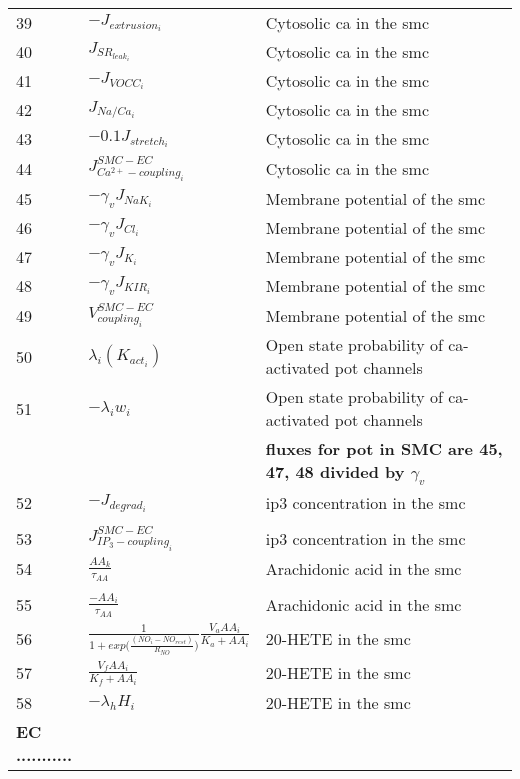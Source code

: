 \documentclass[]{article}
\newcommand{\pot}{\gls{pot}\xspace}
\newcommand{\ca}{\gls{ca}\xspace}
\newcommand{\ip}{\gls{ip3}\xspace}
\begin{document}
\begin{longtable}[h!] { p{0.12\linewidth}  p{0.28\linewidth}     p{0.6\linewidth} }
39 &    $- J_{extrusion_{i}} $ &Cytosolic \ca in the \gls{smc} \\
40 &    $  J_{SR_{leak_{i}}}$ & Cytosolic \ca in the \gls{smc}\\
41 &    $- J_{VOCC_{i}}  $ &Cytosolic \ca in the \gls{smc}  \\
42 &    $ J_{Na/Ca_{i}} $ & Cytosolic \ca in the \gls{smc}\\
43 &    $- 0.1J_{stretch_{i}} $ & Cytosolic \ca in the \gls{smc}\\
44 &    $J_{Ca^{2+}-coupling_{i}}^{SMC-EC} $ &Cytosolic \ca in the \gls{smc} \\
45 &    $-\gamma_v J_{NaK_{i}}$ & Membrane potential of the \gls{smc}\\
46 &    $-\gamma_v J_{Cl_{i}}  $ & Membrane potential of the \gls{smc}\\
47 &    $-\gamma_v J_{K_{i}}$ & Membrane potential of the \gls{smc} \\
48 &    $-\gamma_v J_{KIR_{i}} $ & Membrane potential of the \gls{smc}\\
49 &    $V^{SMC-EC}_{coupling_{i}} $ &  Membrane potential of the \gls{smc}\\
50 &    $ \lambda_{i} \left( K_{act_{i}} \right)$ & Open state probability of \ca-activated \pot channels\\
51 &    $-\lambda_{i}  w_{i}  $ &  Open state probability of \ca-activated \pot channels\\
 &   &  \textbf{fluxes for \pot in SMC are 45, 47, 48 divided by $\gamma_v$} \\
52 &    $ - J_{degrad_{i}}$ & \ip concentration in the \gls{smc}\\
 &   &  \\
53 &    $ J^{SMC-EC}_{IP_{3}-coupling_{i}}$ & \ip concentration in the \gls{smc}\\
54 &    $ \frac{AA_{k}}{\tau_{AA}}$ &Arachidonic acid in the \gls{smc} \\
 & &      \\
55 &    $ \frac{-AA_i}{\tau_{AA}}$ &Arachidonic acid in the \gls{smc} \\
56 &    $\frac{1}{1+{exp(\frac{(NO_i-NO_{rest})}{R_{NO}}})}\frac{V_a AA_i}{K_a+AA_i} $ & 20-HETE in the \gls{smc}\\
57 &    $ \frac{V_f AA_i}{K_f+AA_i}$ &  20-HETE in the \gls{smc}\\
58 &    $ -\lambda_h H_i$ & 20-HETE in the \gls{smc} \\
 \textbf{EC ...........}   &  & \\

\end{longtable}
\end{document}
